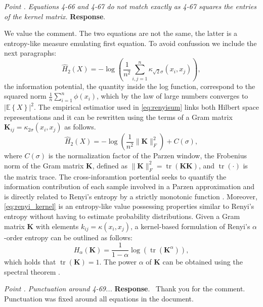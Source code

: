 \documentclass[runningheads]{llncs}
\newcommand{\mat}[1]{\bm {#1}}
\newenvironment{reviewer}{\setcounter{pointcounter}{1}}{}
\newcommand{\changes}[1]{\textcolor[rgb]{1.00,0.00,0.00}{#1}}
\newcommand{\point}[1]{\medskip \noindent
 \textsl{{\fontseries{b}\selectfont Point \thepointcounter}.
 \stepcounter{pointcounter} #1}}
\newcommand{\reply}{\medskip \noindent \textbf{Response}.\ }
\begin{document}
\begin{reviewer}
\point{Equations 4-66 and 4-67 do not match exactly as 4-67 squares the entries of the kernel matrix.}
\reply{
    We value the comment. The two equations are not the same, the latter is a entropy-like measure emulating first equation. To avoid confussion we include the next paragraphs:
    \changes{ 
\begin{equation}\label{eq:renyisum}
    \hat{H}_{2}(X)=-\log \left(\frac{1}{n^{2}} \sum_{i, j=1}^{n} \kappa_{\sqrt{2}\sigma}\left(x_{i}, x_{j}\right)\right),
\end{equation}
the information potential, the quantity inside the log function, correspond to the squared norm $\frac{1}{n} \sum_{i=1}^{n} \phi(x_{i})$, which by the law of large numbers converges to $\left|\mathbb{E}\left\{ X \right\}\right|^{2}$. The empirical estimatior used in \cref{eq:renyisum} links both Hilbert space representations and it can be rewritten using the terms of a Gram matrix $\mat{K}_{ij} = \kappa_{2\sigma}\left(x_{i}, x_{j}\right)$ as follows.
\begin{equation}\label{eq:renyi_kernel}
    \hat{H}_{2}(X)=-\log \left(\frac{1}{n^{2}}  \|\mat{K}\|_{F}^{2}\right)+C(\sigma),
\end{equation}
where $C(\sigma)$ is the normalization factor of the Parzen window, the Frobenius norm of the Gram matrix $\mat{K}$, defined as $\|\mat{K}\|_{F}^{2}=\operatorname{tr}(\mat{K K})$, and $\operatorname{tr}(\cdot)$ is the matrix trace.
}
\changes{The cross-inforamtion portential seeks to quantify the information contribution of each sample involved in a Parzen approximation and is directly related to Renyi's entropy by a strictly monotonic function \cite{giraldo2014measures}. Moreover, \cref{eq:renyi_kernel} is an entropy-like value possessing properties similar to Renyi's entropy without having to estimate probability distributions. Given a Gram matrix $\mat{K}$ with elements $k_{i j} = \kappa\left(x_{i}, x_{j}\right)$, a kernel-based formulation of Renyi's $\alpha$-order entropy can be outlined as follows:}
\begin{equation}
    H_{\alpha}(\mat{K})=\frac{1}{1-\alpha} \log \left(\operatorname{tr}\left(\mat{K}^{\alpha}\right)\right),    
\end{equation}
which holds that $\operatorname{tr}(\mat{K})=1$. The power $\alpha$ of $\mat{K}$ can be obtained using the spectral theorem \cite{giraldo2014measures}.

}

\point{Punctuation around 4-69...}
\reply{
    Thank you for the comment. Punctuation was fixed around all equations in the document.
}


\end{reviewer}
\end{document}
